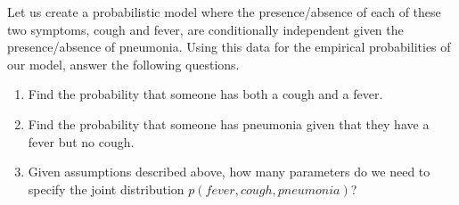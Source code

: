 \documentclass[11pt]{article}
\begin{document}
Let us create a probabilistic model where the presence/absence of each of these two symptoms, cough and fever, are conditionally independent given the presence/absence of pneumonia. Using this data for the empirical probabilities of our model, answer the following questions.
\begin{enumerate}
\item Find the probability that someone has both a cough and a fever. \\
\begin{answertext}{6cm}{}

  
\end{answertext} 
\item Find the probability that someone has pneumonia given that they have a fever but no cough. \\
\begin{answertext}{6cm}{}


\end{answertext} 

\newpage

\item Given assumptions described above, how many parameters do we need to specify the joint distribution $p(fever, cough, pneumonia)$?  \\
\begin{answertext}{6cm}{}


\end{answertext} 
\end{enumerate}


\pagebreak
\end{document}
